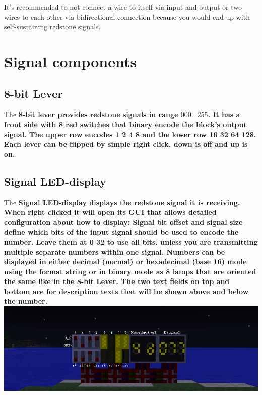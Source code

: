 \documentclass[11pt]{article} %
\begin{document}
It's recommended to not connect a wire to itself via input and output or two wires to each other via bidirectional connection because you would end up with self-sustaining redstone signals.

\section{Signal components}
\subsection{8-bit Lever}
The \bf 8-bit lever \rm provides redstone signals in range $000\dots255$. It has a front side with 8 red switches that binary encode the block's output signal. The upper row encodes 1 2 4 8 and the lower row 16 32 64 128. Each lever can be flipped by simple right click, down is off and up is on.

\subsection{Signal LED-display}
The \bf Signal LED-display \rm displays the redstone signal it is receiving. When right clicked it will open its GUI that allows detailed configuration about how to display:
Signal bit offset and signal size define which bits of the input signal should be used to encode the number. Leave them at 0 32 to use all bits, unless you are transmitting multiple separate numbers within one signal. Numbers can be displayed in either decimal (normal) or hexadecimal (base 16) mode using the format string or in binary mode as 8 lamps that are oriented the same like in the 8-bit Lever.
The two text fields on top and bottom are for description texts that will be shown above and below the number.
\includegraphics[width=\textwidth]{8_bit_io}\\

\newpage
\end{document}
